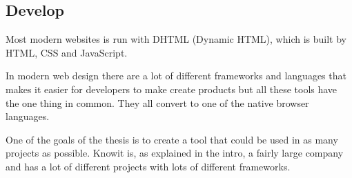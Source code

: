 \subsection{Develop}%
\label{sub:Develop}

Most modern websites is run with DHTML (Dynamic HTML), which is built by HTML, CSS and JavaScript.  



In modern web design there are a lot of different frameworks and languages that makes it easier for developers to make create products but all these tools have the one thing in common. They all convert to one of the native browser languages. 

One of the goals of the thesis is to create a tool that could be used in as many projects as possible. Knowit is, as explained in the intro, a fairly large company and has a lot of different projects with lots of different frameworks.   



